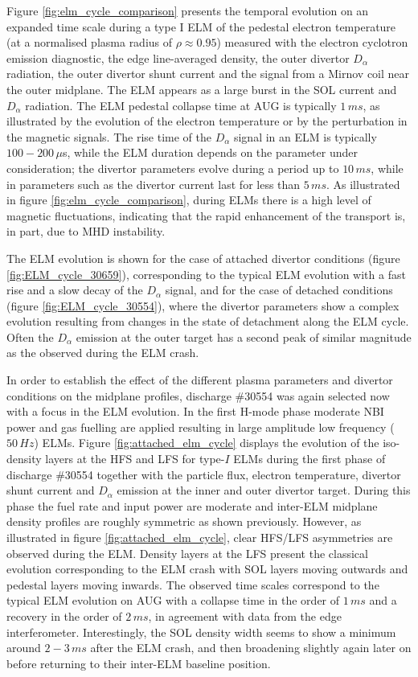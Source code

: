 \documentclass[12pt]{iopart}
\begin{document}
Figure \ref{fig:elm_cycle_comparison} presents the temporal evolution on an expanded time scale during a type I ELM of the pedestal electron temperature (at a normalised plasma radius of $\rho \approx 0.95$) measured with the electron cyclotron emission diagnostic, the edge line-averaged density, the outer divertor $D_\alpha$  radiation, the outer divertor shunt current and the signal from a Mirnov coil near the outer midplane. The ELM appears as a large burst in the SOL current and $D_\alpha$ radiation. The ELM pedestal collapse time at AUG is typically $1\,ms$, as illustrated by the evolution of the electron temperature or by the perturbation in the magnetic signals. The rise time of the $D_\alpha$ signal in an ELM is typically  $100-200\,\mu$s, while the ELM duration depends on the parameter under consideration; the divertor parameters evolve during a period up to $10\,ms$,  while in parameters such as the divertor current last for less than $5\,ms$. As illustrated in figure \ref{fig:elm_cycle_comparison}, during ELMs there is a high level of magnetic fluctuations, indicating that the rapid enhancement of the transport is, in part, due to MHD instability. 

The ELM evolution is shown for the case of attached divertor conditions (figure \ref{fig:ELM_cycle_30659}), corresponding to the typical ELM evolution with a fast rise and a slow decay of the $D_\alpha$ signal, and for the case of detached conditions (figure \ref{fig:ELM_cycle_30554}), where the divertor parameters show a complex evolution resulting from changes in the state of detachment along the ELM cycle. Often the $D_\alpha$ emission at the outer target has a second peak of similar magnitude as the observed during the ELM crash.

In order to establish the effect of the different plasma parameters and divertor conditions on the midplane profiles, discharge \#30554 was again selected now with a focus in the ELM evolution. In the first H-mode phase moderate NBI power and gas fuelling are applied resulting in large amplitude low frequency ($50\,Hz$) ELMs. Figure \ref{fig:attached_elm_cycle} displays the evolution of the iso-density layers at the HFS and LFS for type-$I$ ELMs during the first phase of discharge \#30554 together with the particle flux, electron temperature, divertor shunt current and $D_\alpha$ emission at the inner and outer divertor target. During this phase the fuel rate and input power are moderate and inter-ELM midplane density profiles are roughly symmetric as shown previously. However, as illustrated in figure \ref{fig:attached_elm_cycle}, clear HFS/LFS asymmetries are observed during the ELM. Density layers at the LFS present the classical evolution corresponding to the ELM crash with SOL layers moving outwards and pedestal layers moving inwards. The observed time scales correspond to the typical ELM evolution on AUG with a collapse time in the order of $1\,ms$ and a recovery in the order of $2\,ms$, in agreement with data from the edge interferometer. Interestingly, the SOL density width seems to show a minimum around $2-3\,ms$ after the ELM crash, and then broadening slightly again later on before returning to their inter-ELM baseline position.
\end{document}
